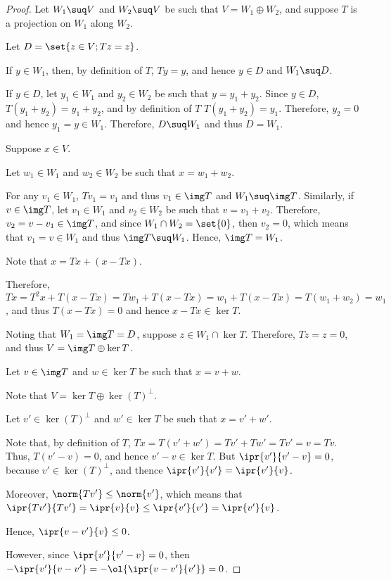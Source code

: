 \documentclass[11pt]{scrartcl}
\begin{document}
\begin{proof}
  \hfill

  Let $W_1\suq V$ and $W_2\suq V$ be such that $V = W_1\oplus W_2$,
  and suppose $T$ is a projection on $W_1$ along $W_2$.

  Let $D = \set{z\in V; Tz = z}$.

  If $y\in W_1$, then, by definition of $T$, $Ty =y$, and hence
  $y\in D$ and $W_1\suq D$.

  If $y \in D$, let $y_1\in W_1$ and $y_2\in W_2$ be such that
  $y=y_1+y_2$. Since $y\in D$, $T(y_1+y_2) = y_1+y_2$, and by
  definition of $T$ $T(y_1+y_2) = y_1$. Therefore, $y_2 = 0$ and hence
  $y_1=y\in W_1$. Therefore, $D\suq W_1$ and thus $D = W_1$.

  Suppose $x\in V$.

  Let $w_1\in W_1$ and $w_2\in W_2$ be such that $x = w_1+ w_2$.

  For any $v_1\in W_1$, $Tv_1 = v_1$ and thus $v_1\in \img T$ and
  $W_1\suq \img T$. Similarly, if $v\in \img T$, let $v_1\in W_1$ and
  $v_2\in W_2$ be such that $v = v_1+v_2$. Therefore,
  $v_2= v-v_1\in \img T$, and since $W_1\cap W_2= \set{0}$, then
  $v_2=0$, which means that $v_1=v\in W_1$ and thus $\img T \suq
  W_1$. Hence, $\img T = W_1$.

  Note that $x = Tx +(x-Tx)$.

  Therefore,
  $Tx = T^2x + T(x-Tx) = Tw_1+T(x-Tx) =w_1+T(x-Tx) = T(w_1+w_2) =
  w_1$, and thus $T(x-Tx) = 0$ and hence $x-Tx \in \ker T$.

  Noting that $W_1=\img T = D$, suppose $z\in W_1 \cap\ker
  T$. Therefore, $Tz = z = 0$, and thus $V = \img T\oplus \ker T$.

  Let $v\in \img T$ and $w\in \ker T$ be such that $x = v+ w$.

  Note that $V = \ker T \oplus\ker(T)^{\bot}$.

  Let $v'\in\ker(T)^{\bot}$ and $w'\in \ker T$ be such that $x = v'+w'$.

  Note that, by definition of $T$,
  $Tx = T(v'+w') = Tv' +Tw' = Tv' = v = Tv$. Thus, $T(v'-v) = 0$, and
  hence $v'-v\in \ker T$. But $\ipr{v'}{v'-v} = 0$, because
  $v'\in \ker(T)^{\bot}$, and thence $\ipr{v'}{v'}=\ipr{v'}{v}$.

  Moreover, $\norm{Tv'}\leq \norm{v'}$, which means that
  $\ipr{Tv'}{Tv'} = \ipr{v}{v} \leq \ipr{v'}{v'}=\ipr{v'}{v}$.

  Hence, $\ipr{v-v'}{v}\leq 0$.

  However, since $\ipr{v'}{v'-v}=0$, then
  $-\ipr{v'}{v-v'} = -\ol{\ipr{v-v'}{v'}} = 0$.


\end{proof}
\end{document}
